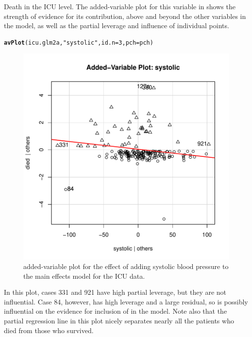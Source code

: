 \documentclass[11pt]{book}\usepackage[]{graphicx}\usepackage[]{color}
\makeatletter
\newcommand{\hlnum}[1]{\textcolor[rgb]{0.686,0.059,0.569}{#1}}%
\newcommand{\hlstr}[1]{\textcolor[rgb]{0.192,0.494,0.8}{#1}}%
\newcommand{\hlstd}[1]{\textcolor[rgb]{0.345,0.345,0.345}{#1}}%
\newcommand{\hlkwc}[1]{\textcolor[rgb]{0.333,0.667,0.333}{#1}}%
\newcommand{\hlkwd}[1]{\textcolor[rgb]{0.737,0.353,0.396}{\textbf{#1}}}%
\newenvironment{kframe}{%
 \def\at@end@of@kframe{}%
 \ifinner\ifhmode%
  \def\at@end@of@kframe{\end{minipage}}%
  \begin{minipage}{\columnwidth}%
 \fi\fi%
 \def\FrameCommand##1{\hskip\@totalleftmargin \hskip-\fboxsep
 \colorbox{shadecolor}{##1}\hskip-\fboxsep
     \hskip-\linewidth \hskip-\@totalleftmargin \hskip\columnwidth}%
 \MakeFramed {\advance\hsize-\width
   \@totalleftmargin\z@ \linewidth\hsize
   \@setminipage}}%
 {\par\unskip\endMakeFramed%
 \at@end@of@kframe}
\newenvironment{knitrout}{}{} %
\renewenvironment{knitrout}{\small\renewcommand{\baselinestretch}{.85}}{} %
\makeatother
\begin{document}
\begin{Example}[icu3]{Death in the ICU}
level.  The added-variable plot for this variable in 
shows the strength of evidence for its contribution, above and beyond the other variables
in the model, as well as the partial leverage and influence of individual points.
\begin{knitrout}
\color{fgcolor}\begin{kframe}
\begin{alltt}
\hlkwd{avPlot}\hlstd{(icu.glm2a,} \hlstr{"systolic"}\hlstd{,} \hlkwc{id.n}\hlstd{=}\hlnum{3}\hlstd{,} \hlkwc{pch}\hlstd{=pch)}
\end{alltt}
\end{kframe}\begin{figure}[!htbp]


\centerline{\includegraphics[width=.6\textwidth]{ch07/fig/icu3-avp2-1} }

\caption[added-variable plot for the effect of adding systolic blood pressure to the main effects model for the ICU data]{added-variable plot for the effect of adding systolic blood pressure to the main effects model for the ICU data.\label{fig:icu3-avp2}}
\end{figure}


\end{knitrout}
In this plot, cases 331 and 921 have high partial leverage, but they are not influential.
Case 84, however, has high leverage and a large residual, so is possibly influential on the
evidence for inclusion of  in the model.
Note also that the partial regression line in this plot nicely separates nearly all the patients who died
from those who survived.

\end{Example}
\end{document}
